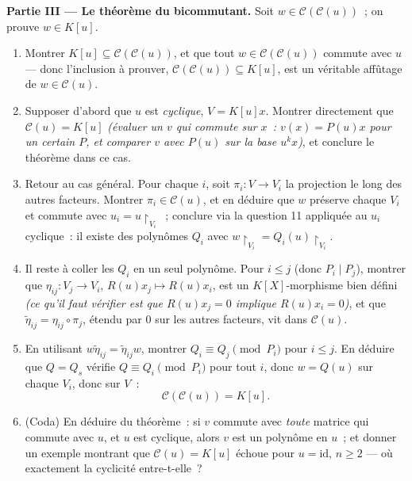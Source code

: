 \begin{problem}
\medskip
\noindent\textbf{Partie III --- Le théorème du bicommutant.}
Soit $w \in \mathcal C(\mathcal C(u))$~; on prouve $w \in
K[u]$.
\begin{enumerate}[resume]
  \item Montrer $K[u] \subseteq \mathcal C(\mathcal C(u))$, et
        que tout $w \in \mathcal C(\mathcal C(u))$ commute avec
        $u$ --- donc l'inclusion à prouver, $\mathcal
        C(\mathcal C(u)) \subseteq K[u]$, est un véritable
        affûtage de $w \in \mathcal C(u)$.
  \item Supposer d'abord que $u$ est \emph{cyclique}, $V =
        K[u]x$. Montrer directement que $\mathcal C(u) = K[u]$
        \emph{(évaluer un $v$ qui commute sur $x$~: $v(x) =
        P(u)x$ pour un certain $P$, et comparer $v$ avec $P(u)$
        sur la base $u^k x$)}, et conclure le théorème dans ce
        cas.
  \item Retour au cas général. Pour chaque $i$, soit $\pi_i
        \colon V \to V_i$ la projection le long des autres
        facteurs. Montrer $\pi_i \in \mathcal C(u)$, et en
        déduire que $w$ préserve chaque $V_i$ et commute avec
        $u_i = u\restriction_{V_i}$~; conclure via la question
        11 appliquée au $u_i$ cyclique~: il existe des polynômes
        $Q_i$ avec $w\restriction_{V_i} =
        Q_i(u)\restriction_{V_i}$.
  \item Il reste à coller les $Q_i$ en un seul polynôme. Pour $i
        \leq j$ (donc $P_i \mid P_j$), montrer que $\eta_{ij}
        \colon V_j \to V_i$, $R(u)x_j \mapsto R(u)x_i$, est un
        $K[X]$-morphisme bien défini \emph{(ce qu'il faut
        vérifier est que $R(u)x_j = 0$ implique $R(u)x_i =
        0$)}, et que $\tilde\eta_{ij} = \eta_{ij}\circ\pi_j$,
        étendu par $0$ sur les autres facteurs, vit dans
        $\mathcal C(u)$.
  \item En utilisant $w\tilde\eta_{ij} = \tilde\eta_{ij}w$,
        montrer $Q_i \equiv Q_j \pmod{P_i}$ pour $i \leq j$. En
        déduire que $Q = Q_s$ vérifie $Q \equiv Q_i \pmod {P_i}$
        pour tout $i$, donc $w = Q(u)$ sur chaque $V_i$, donc
        sur $V$~:
        \[
        \boxed{\ \mathcal C(\mathcal C(u)) = K[u].\ }
        \]
  \item (Coda) En déduire du théorème~: si $v$ commute avec
        \emph{toute} matrice qui commute avec $u$, et $u$ est
        cyclique, alors $v$ est un polynôme en $u$~; et donner
        un exemple montrant que $\mathcal C(u) = K[u]$ échoue
        pour $u = \mathrm{id}$, $n \geq 2$ --- où exactement
        la cyclicité entre-t-elle~?
\end{enumerate}


\end{problem}
